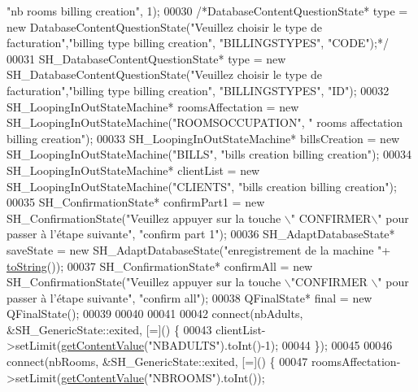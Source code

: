 \begin{DoxyCode}
       \textcolor{stringliteral}{"nb rooms billing creation"}, 1);
00030     \textcolor{comment}{/*DatabaseContentQuestionState* type = new DatabaseContentQuestionState("Veuillez choisir le type de
       facturation","billing type billing creation", "BILLINGSTYPES", "CODE");*/}
00031     SH\_DatabaseContentQuestionState* type = \textcolor{keyword}{new} SH\_DatabaseContentQuestionState(\textcolor{stringliteral}{"Veuillez choisir le type
       de facturation"},\textcolor{stringliteral}{"billing type billing creation"}, \textcolor{stringliteral}{"BILLINGSTYPES"}, \textcolor{stringliteral}{"ID"});
00032     SH\_LoopingInOutStateMachine* roomsAffectation = \textcolor{keyword}{new} SH\_LoopingInOutStateMachine(\textcolor{stringliteral}{"ROOMSOCCUPATION"}, \textcolor{stringliteral}{"
      rooms affectation billing creation"});
00033     SH\_LoopingInOutStateMachine* billsCreation = \textcolor{keyword}{new} SH\_LoopingInOutStateMachine(\textcolor{stringliteral}{"BILLS"}, \textcolor{stringliteral}{"bills creation
       billing creation"});
00034     SH\_LoopingInOutStateMachine* clientList = \textcolor{keyword}{new} SH\_LoopingInOutStateMachine(\textcolor{stringliteral}{"CLIENTS"}, \textcolor{stringliteral}{"bills creation
       billing creation"});
00035     SH\_ConfirmationState* confirmPart1 = \textcolor{keyword}{new} SH\_ConfirmationState(\textcolor{stringliteral}{"Veuillez appuyer sur la touche \(\backslash\)"
      CONFIRMER\(\backslash\)" pour passer à l'étape suivante"}, \textcolor{stringliteral}{"confirm part 1"});
00036     SH\_AdaptDatabaseState* saveState = \textcolor{keyword}{new} SH\_AdaptDatabaseState(\textcolor{stringliteral}{"enregistrement de la machine "}+
      \hyperlink{classSimpleHotel_1_1SH__GenericStateMachine_ad6dd1d0986c40684410ed94f1f610b12}{toString}());
00037     SH\_ConfirmationState* confirmAll = \textcolor{keyword}{new} SH\_ConfirmationState(\textcolor{stringliteral}{"Veuillez appuyer sur la touche \(\backslash\)"CONFIRMER
      \(\backslash\)" pour passer à l'étape suivante"}, \textcolor{stringliteral}{"confirm all"});
00038     QFinalState* \textcolor{keyword}{final} = \textcolor{keyword}{new} QFinalState();
00039 
00040 
00041 
00042     connect(nbAdults, &SH\_GenericState::exited, [=]() \{
00043         clientList->setLimit(\hyperlink{classSimpleHotel_1_1SH__InOutStateMachine_a4e2afab69163c7ce53dd6a40c793d5dc}{getContentValue}(\textcolor{stringliteral}{"NBADULTS"}).toInt()-1);
00044     \});
00045 
00046     connect(nbRooms, &SH\_GenericState::exited, [=]() \{
00047         roomsAffectation->setLimit(\hyperlink{classSimpleHotel_1_1SH__InOutStateMachine_a4e2afab69163c7ce53dd6a40c793d5dc}{getContentValue}(\textcolor{stringliteral}{"NBROOMS"}).toInt());

\end{DoxyCode}
